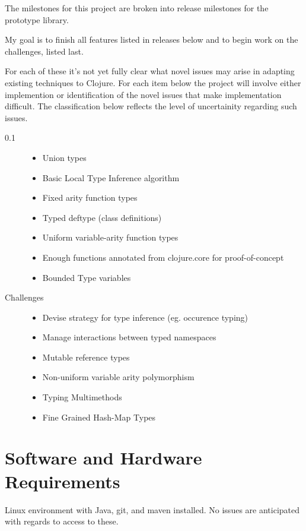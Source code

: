 
The milestones for this project are broken into release milestones
for the prototype library.

My goal is to finish all features listed in releases below
and to begin work on the challenges, listed last.

For each of these it's not yet fully clear what novel issues may 
arise in adapting existing techniques to Clojure.  For each item 
below the project will involve either implemention or identification 
of the novel issues that make implementation difficult.  
The classification below reflects the level of uncertainity 
regarding such issues.

\begin{description}
\item[0.1]
  \begin{itemize}
  \item Union types
  \item Basic Local Type Inference algorithm
  \item Fixed arity function types
  \item Typed deftype (class definitions)
  \item Uniform variable-arity function types
  \item Enough functions annotated from clojure.core for proof-of-concept
  \item Bounded Type variables
  \end{itemize}
\item[Challenges]
  \begin{itemize}
  \item Devise strategy for type inference (eg. occurence typing)
  \item Manage interactions between typed namespaces
  \item Mutable reference types
  \item Non-uniform variable arity polymorphism
  \item Typing Multimethods
  \item Fine Grained Hash-Map Types
  \end{itemize}

\end{description}
\section*{Software and Hardware Requirements}

Linux environment with Java, git, and maven installed.
No issues are anticipated with regards to access to these.

